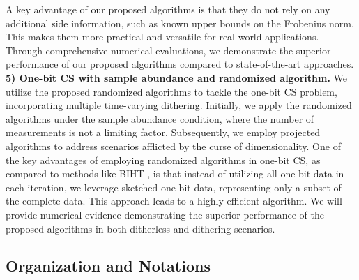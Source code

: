 \documentclass[12pt,draftcls,onecolumn]{IEEEtran}
\begin{document}
A key advantage of our proposed algorithms is that they do not rely on any additional side information, such as known upper bounds on the Frobenius norm. This makes them more practical and versatile for real-world applications.
Through comprehensive numerical evaluations, we demonstrate the superior performance of our proposed algorithms compared to state-of-the-art approaches.
\\
\textbf{5) One-bit CS with sample abundance and randomized algorithm.}
We utilize the proposed randomized algorithms to tackle the one-bit CS problem, incorporating multiple time-varying dithering. Initially, we apply the randomized algorithms under the sample abundance condition, where the number of measurements is not a limiting factor. Subsequently, we employ projected algorithms to address scenarios afflicted by the curse of dimensionality.
One of the key advantages of employing randomized algorithms in one-bit CS, as compared to methods like BIHT \cite{jacques2013robust,baraniuk2017exponential}, is that instead of utilizing all one-bit data in each iteration, we leverage sketched one-bit data, representing only a subset of the complete data. This approach leads to a highly efficient algorithm.
We will provide numerical evidence demonstrating the superior performance of the proposed algorithms in both ditherless and dithering scenarios.

\subsection{Organization and Notations}
\end{document}
